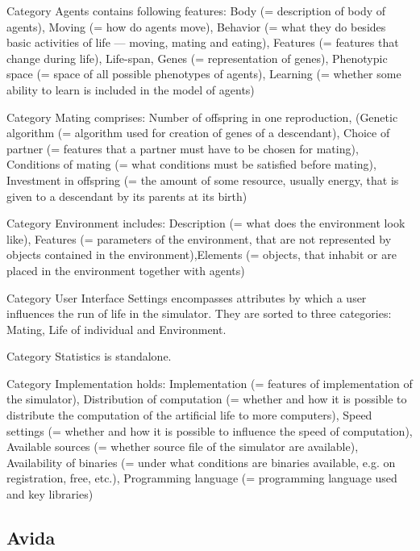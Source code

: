 \documentclass[a4paper,12pt]{report}
\begin{document}
Category Agents contains following features: Body (= description of body of agents), Moving (= how do agents move), Behavior (= what they do besides basic activities of life --- moving, mating and eating), Features (= features that change during life), Life-span, Genes (= representation of genes), Phenotypic space (= space of all possible phenotypes of agents), Learning (= whether some ability to learn is included in the model of agents)

Category Mating comprises: Number of offspring in one reproduction, (Genetic algorithm (= algorithm used for creation of genes of a descendant), Choice of partner (= features that a partner must have to be chosen for mating), Conditions of mating (= what conditions must be satisfied before mating), Investment in offspring (= the amount of some resource, usually energy, that is given to a descendant by its parents at its birth)

Category Environment includes: Description (= what does the environment look like), Features (= parameters of the environment, that are not represented by objects contained in the environment),Elements (= objects, that inhabit or are placed in the environment together with agents)

Category User Interface Settings  encompasses attributes by which a user  influences the run of life in the simulator. They are sorted to three categories: Mating, Life of individual and Environment.

Category Statistics is standalone.

Category Implementation holds: Implementation (= features of implementation of the simulator), Distribution of computation (= whether and how it is possible to distribute the computation of the artificial life to more computers), Speed settings (= whether and how it is possible to influence the speed of computation), Available sources (= whether source file of the simulator are available), Availability of binaries (= under what conditions are binaries available, e.g. on registration, free, etc.), Programming language (= programming language used and key libraries)

 
\subsection {Avida}
\end{document}
